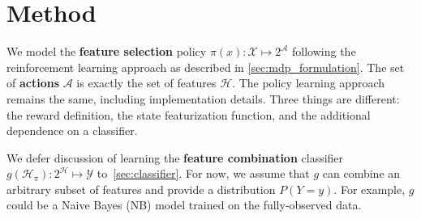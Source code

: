 \section{Method}\label{sec:clf_method}

We model the \textbf{feature selection} policy $\pi(x): \mathcal{X} \mapsto 2^\mathcal{A}$ following the reinforcement learning approach as described in \autoref{sec:mdp_formulation}.
The set of \textbf{actions} $\mathcal{A}$ is exactly the set of features $\mathcal{H}$.
The policy learning approach remains the same, including implementation details.
Three things are different: the reward definition, the state featurization function, and the additional dependence on a classifier.

We defer discussion of learning the \textbf{feature combination} classifier $g(\mathcal{H}_\pi) : 2^\mathcal{H} \mapsto \mathcal{Y}$ to~\autoref{sec:classifier}.
For now, we assume that $g$ can combine an arbitrary subset of features and provide a distribution $P(Y = y)$.
For example, $g$ could be a Naive Bayes (NB) model trained on the fully-observed data.






